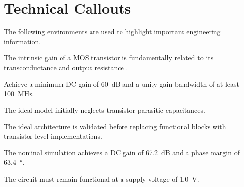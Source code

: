 
\section{Technical Callouts}

The following environments are used to highlight important
engineering information.

The intrinsic gain of a MOS transistor is fundamentally related
to its transconductance and output resistance
\cite{razavi_design_2017}.

\begin{designobjective}
	
	Achieve a minimum DC gain of \qty{60}{\deci\bel} and a unity-gain
	bandwidth of at least \qty{100}{\mega\hertz}.
	
\end{designobjective}


\begin{assumption}
	
	The ideal model initially neglects transistor parasitic capacitances.
	
\end{assumption}


\begin{designnote}
	
	The ideal architecture is validated before replacing functional
	blocks with transistor-level implementations.
	
\end{designnote}


\begin{keyresult}
	
	The nominal simulation achieves a DC gain of
	\qty{67.2}{\deci\bel} and a phase margin of
	\qty{63.4}{\degree}.
	
\end{keyresult}


\begin{designconstraint}
	
	The circuit must remain functional at a supply voltage of
	\qty{1.0}{\volt}.
	
\end{designconstraint}